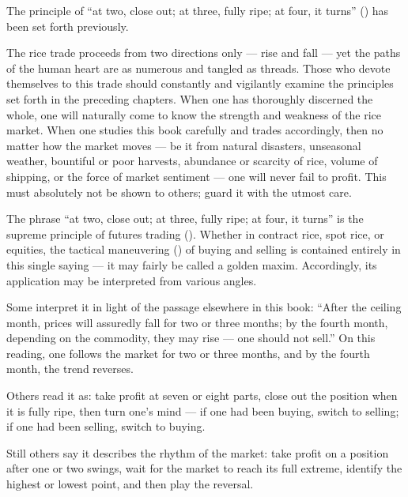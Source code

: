 \begin{sokyubox}
{\small\itshape\color{sokyubar} }

\medskip
The principle of ``at two, close out; at three, fully ripe; at four,
it turns'' () has been set forth
previously.

The rice trade proceeds from two directions only --- rise and fall ---
yet the paths of the human heart are as numerous and tangled as
threads. Those who devote themselves to this trade should constantly
and vigilantly examine the principles set forth in the preceding
chapters. When one has thoroughly discerned the whole, one will
naturally come to know the strength and weakness of the rice market.
When one studies this book carefully and trades accordingly, then no
matter how the market moves --- be it from natural disasters,
unseasonal weather, bountiful or poor harvests, abundance or
scarcity of rice, volume of shipping, or the force of market
sentiment --- one will never fail to profit. This must absolutely not
be shown to others; guard it with the utmost care.
\end{sokyubox}

\commentary
The phrase ``at two, close out; at three, fully ripe; at four, it
turns'' is the supreme principle of futures trading ().
Whether in contract rice, spot rice, or equities, the tactical
maneuvering () of buying and selling is contained
entirely in this single saying --- it may fairly be called a golden
maxim. Accordingly, its application may be interpreted from various
angles.

Some interpret it in light of the passage elsewhere in this book:
``After the ceiling month, prices will assuredly fall for two or three
months; by the fourth month, depending on the commodity, they may
rise --- one should not sell.'' On this reading, one follows the
market for two or three months, and by the fourth month, the trend
reverses.

Others read it as: take profit at seven or eight parts, close out
the position when it is fully ripe, then turn one's mind --- if one
had been buying, switch to selling; if one had been selling, switch
to buying.

Still others say it describes the rhythm of the market: take profit
on a position after one or two swings, wait for the market to reach
its full extreme, identify the highest or lowest point, and then
play the reversal.

